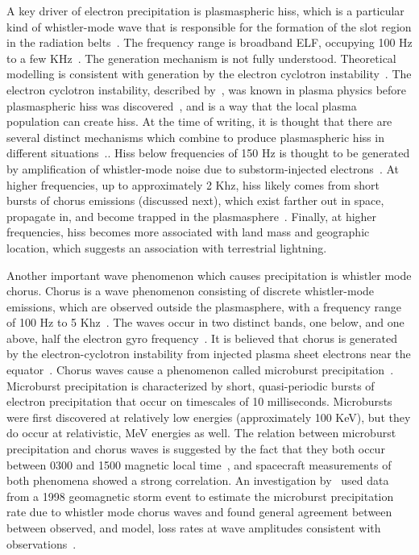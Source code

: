 A key driver of electron precipitation is plasmaspheric hiss, which is a particular kind of whistler-mode wave that is responsible for the formation of the slot region in the radiation belts~\citep{lyons1972, lyons1973}. The frequency range is broadband ELF, occupying 100 Hz to a few KHz~\citep{millan2007}. The generation mechanism is not fully understood. Theoretical modelling is consistent with generation by the electron cyclotron instability~\citep{millan2007, huang1983, church1983, meredith04}. The electron cyclotron instability, described by~\cite{thorne1979a}, was known in plasma physics before plasmaspheric hiss was discovered~\citep{kennel1966}, and is a way that the local plasma population can create hiss. At the time of writing, it is thought that there are several distinct mechanisms which combine to produce plasmaspheric hiss in different situations~\citep{thorne2010,bortnick2008,bortnick2009}.. Hiss below frequencies of 150 Hz is thought to be generated by amplification of whistler-mode noise due to substorm-injected electrons~\citep{meridith2018}. At higher frequencies, up to approximately 2 Khz, hiss likely comes from short bursts of chorus emissions (discussed next), which exist farther out in space, propagate in, and become trapped in the plasmasphere~\citep{meridith2018}. Finally, at higher frequencies, hiss becomes more associated with land mass and geographic location, which suggests an association with terrestrial lightning. 

Another important wave phenomenon which causes precipitation is whistler mode chorus. Chorus is a wave phenomenon consisting of discrete whistler-mode emissions, which are observed outside the plasmasphere, with a frequency range of 100 Hz to 5 Khz~\citep{millan2007}. The waves occur in two distinct bands, one below, and one above, half the electron gyro frequency~\citep{Tsurutani1974,thorne2010}. It is believed that chorus is generated by the electron-cyclotron instability from injected plasma sheet electrons near the equator~\citep{kennel1966,millan2007}. Chorus waves cause a phenomenon called microburst precipitation~\citep{millan2007}. Microburst precipitation is characterized by short, quasi-periodic bursts of electron precipitation that occur on timescales of 10 milliseconds. Microbursts were first discovered at relatively low energies (approximately 100 KeV), but they do occur at relativistic, MeV energies as well. The relation between microburst precipitation and chorus waves is suggested by the fact that they both occur between 0300 and 1500 magnetic local time~\citep{lorentzen2001,millan2007}, and spacecraft measurements of both phenomena showed a strong correlation. An investigation by~\citet{thorne2005} used data from a 1998 geomagnetic storm event to estimate the microburst precipitation rate due to whistler mode chorus waves and found general agreement between between observed, and model, loss rates at wave amplitudes consistent with observations~\citet{millan2007}.

